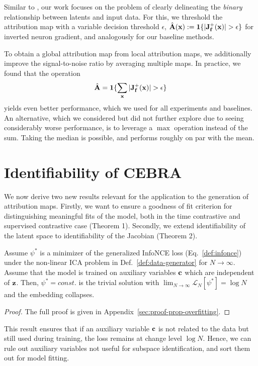         Similar to \citet{afchar2021nonzero}, our work focuses on the problem of clearly delineating the \emph{binary} relationship between latents and input data. For this, we threshold the attribution map with a variable decision threshold $\epsilon$, 
        $\hat {\mathbf{A}}(\mathbf{x}) := \mathbf{1}\{| \mathbf{J}_{\mathbf{f}}^+(\mathbf{x}) |  > \epsilon \}$
        for inverted neuron gradient, and analogously for our baseline methods. 

        To obtain a global attribution map from local attribution maps, we additionally improve the signal-to-noise ratio by averaging multiple maps. In practice, we found that the operation
        \begin{equation}\label{eq:estimation}
            \hat{\mathbf{A}} = \mathbf{1}\{\sum_{\mathbf{x}} | \mathbf{J}_{\mathbf{f}}^+(\mathbf{x}) |  > \epsilon\}
        \end{equation}
        yields even better performance, which we used for all experiments and baselines. An alternative, which we considered but did not further explore due to seeing considerably worse performance, is to leverage a $\max$ operation instead of the sum. Taking the median is possible, and performs roughly on par with the mean.
       

    \section{Identifiability of CEBRA}
    \label{sec:identifiability}

    We now derive two new results relevant for the application to the generation of attribution maps. Firstly, we want to ensure a goodness of fit criterion for distinguishing meaningful fits of the model, both in the time contrastive and supervised contrastive case (Theorem 1).
    Secondly, we extend identifiability of the latent space to identifiability of the Jacobian (Theorem 2). 
    

    
    \begin{theorem}\label{thm:overfitting}
        Assume $\psi^*$ is a minimizer of the generalized InfoNCE loss (Eq.~\ref{def:infonce}) under the non-linear ICA problem in Def.~\ref{def:data-generator} for $N \rightarrow \infty$. Assume that the model is trained on auxiliary variables $\mathbf{c}$ which are independent of $\mathbf{z}$.
        Then, $\psi^*=const.$ is the trivial solution with $\lim_{N \rightarrow \infty} \mathcal{L}_N[\psi^*] = \log N$ and the embedding collapses. 
        \begin{proof}%

        The full proof is given in Appendix~\ref{sec:proof-prop-overfitting}.
        \end{proof}
    \end{theorem}
    This result ensures that if an auxiliary variable $\mathbf{c}$ is not related to the data but still used during training, the loss remains at change level $\log N$.
    Hence, we can rule out auxiliary variables not useful for subspace identification, and sort them out for model fitting.
     
